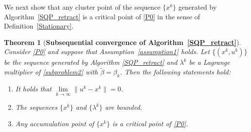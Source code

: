 \documentclass[10pt]{article}
\numberwithin{equation}{section}
\newtheorem{theorem}{Theorem}[section]
\begin{document}
We next show that any cluster point of the sequence $\{x^k\}$ generated by Algorithm~\ref{SQP_retract} is a {\color {blue} critical point} of \eqref{P0} in the sense of Definition~\ref{Stationary}.
\begin{theorem}[{{\bf Subsequential convergence of Algorithm~\ref{SQP_retract}}}]\label{convergence2}
Consider \eqref{P0} and suppose that Assumption~\ref{assumption1} holds. Let {\color{blue}$\{(x^k, u^k)\}$} be the sequence generated by Algorithm \ref{SQP_retract} and $\lambda^k$ be a Lagrange multiplier of \eqref{subproblem2} with $\widetilde{\beta} = \beta_k$. Then the following statements hold:
\begin{enumerate}[{\rm(i)}]
  \item It holds that $\lim\limits_{k\rightarrow\infty}\|u^k - x^k\| = 0$.
  \item The sequences $\{x^k\}$ and $\{\lambda^k\}$ are bounded.
  \item Any accumulation point of $\{x^k\}$ is a {\color{blue}critical point} of \eqref{P0}.
\end{enumerate}
\end{theorem}
\end{document}
